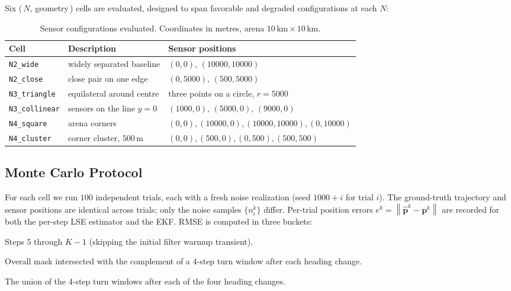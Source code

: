 \documentclass[11pt,a4paper]{article}
\newcommand{\norm}[1]{\left\lVert #1 \right\rVert}
\begin{document}
Six (\,$N$, geometry\,) cells are evaluated, designed to span favorable and
degraded configurations at each $N$:

\begin{table}[h]
\centering
\caption{Sensor configurations evaluated.  Coordinates in metres, arena
$10\,\mathrm{km} \times 10\,\mathrm{km}$.}
\label{tab:geometries}
\begin{tabular}{l l l}
\toprule
\textbf{Cell} & \textbf{Description} & \textbf{Sensor positions} \\
\midrule
\texttt{N2\_wide}      & widely separated baseline & $(0,0),\,(10000,10000)$ \\
\texttt{N2\_close}     & close pair on one edge    & $(0,5000),\,(500,5000)$ \\
\texttt{N3\_triangle}  & equilateral around centre & three points on a circle, $r{=}5000$ \\
\texttt{N3\_collinear} & sensors on the line $y{=}0$ & $(1000,0),\,(5000,0),\,(9000,0)$ \\
\texttt{N4\_square}    & arena corners              & $(0,0),(10000,0),(10000,10000),(0,10000)$ \\
\texttt{N4\_cluster}   & corner cluster, $500$\,m   & $(0,0),(500,0),(0,500),(500,500)$ \\
\bottomrule
\end{tabular}
\end{table}

\subsection{Monte Carlo Protocol}

For each cell we run $100$ independent trials, each with a fresh noise
realization (seed $1000+i$ for trial $i$).  The ground-truth trajectory and
sensor positions are identical across trials; only the noise samples
$\{n_i^k\}$ differ.  Per-trial position errors $e^k = \norm{\hat{\mathbf{p}}^k - \mathbf{p}^k}$ are recorded for both the per-step LSE estimator and the
EKF.  RMSE is computed in three buckets:

\begin{description}[leftmargin=2.5em]
  \item[Overall.] Steps $5$ through $K-1$ (skipping the initial filter
        warmup transient).
  \item[Smooth.] Overall mask intersected with the complement of a
        $4$-step turn window after each heading change.
  \item[Turn.] The union of the $4$-step turn windows after each of the
        four heading changes.
\end{description}
\end{document}
